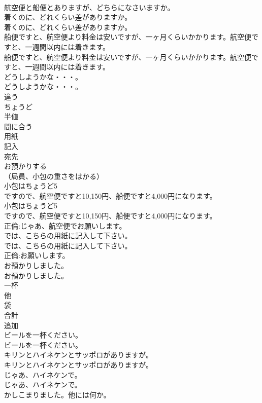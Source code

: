 \documentclass[8pt]{extreport}
\begin{document}
\begin{CJK}{UTF8}{min}
\\	航空便と船便とありますが、どちらになさいますか。 
\\	着くのに、どれくらい差がありますか。	
\\	着くのに、どれくらい差がありますか。 
\\	船便ですと、航空便より料金は安いですが、一ヶ月くらいかかります。航空便ですと、一週間以内には着きます。	
\\	船便ですと、航空便より料金は安いですが、一ヶ月くらいかかります。航空便ですと、一週間以内には着きます。 
\\	どうしようかな・・・。	
\\	どうしようかな・・・。 
\\	違う
\\	ちょうど
\\	半値
\\	間に合う
\\	用紙
\\	記入
\\	宛先
\\	お預かりする
\\	（局員、小包の重さをはかる）	
\\	小包はちょうど5
\\	ですので、航空便ですと10,150円、船便ですと4,000円になります。	
\\	小包はちょうど5
\\	ですので、航空便ですと10,150円、船便ですと4,000円になります。 
\\	正倫:じゃあ、航空便でお願いします。	
\\	では、こちらの用紙に記入して下さい。	
\\	では、こちらの用紙に記入して下さい。 
\\	正倫:お願いします。	
\\	お預かりしました。	
\\	お預かりしました。 
\\	一杯
\\	他
\\	袋
\\	合計
\\	追加
\\	ビールを一杯ください。	
\\	ビールを一杯ください。 
\\	キリンとハイネケンとサッポロがありますが。	
\\	キリンとハイネケンとサッポロがありますが。 
\\	じゃあ、ハイネケンで。	
\\	じゃあ、ハイネケンで。 
\\	かしこまりました。他には何か。	

\end{CJK}
\end{document}
